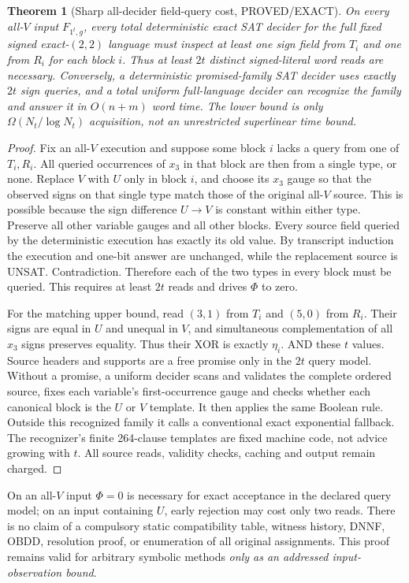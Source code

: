 \documentclass[11pt]{article}
\newtheorem{theorem}{Theorem}
\begin{document}
\begin{theorem}[Sharp all-decider field-query cost, PROVED/EXACT]
On \emph{every} all-$V$ input $F_{1^t,g}$, every total deterministic exact SAT decider for the \emph{full} fixed signed exact-$(2,2)$ language must inspect at least one sign field from $T_i$ \emph{and} one from $R_i$ for each block $i$. Thus at least $2t$ distinct signed-literal word reads are necessary. Conversely, a deterministic promised-family SAT decider uses exactly $2t$ sign queries, and a total uniform full-language decider can recognize the family and answer it in $O(n+m)$ word time. The lower bound is only $\Omega(N_t/\log N_t)$ acquisition, not an unrestricted superlinear time bound.
\end{theorem}
\begin{proof}
Fix an all-$V$ execution and suppose some block $i$ lacks a query from one of $T_i,R_i$. All queried occurrences of $x_3$ in that block are then from a single type, or none. Replace $V$ with $U$ only in block $i$, and choose its $x_3$ gauge so that the observed signs on that single type match those of the original all-$V$ source. This is possible because the sign difference $U\to V$ is constant within either type. Preserve all other variable gauges and all other blocks. Every source field queried by the deterministic execution has exactly its old value. By transcript induction the execution and one-bit answer are unchanged, while the replacement source is UNSAT. Contradiction. Therefore each of the two types in every block must be queried. This requires at least $2t$ reads and drives $\Phi$ to zero.

For the matching upper bound, read $(3,1)$ from $T_i$ and $(5,0)$ from $R_i$. Their signs are equal in $U$ and unequal in $V$, and simultaneous complementation of all $x_3$ signs preserves equality. Thus their XOR is exactly $\eta_i$. AND these $t$ values. Source headers and supports are a free promise only in the $2t$ query model. Without a promise, a uniform decider scans and validates the complete ordered source, fixes each variable's first-occurrence gauge and checks whether each canonical block is the $U$ or $V$ template. It then applies the same Boolean rule. Outside this recognized family it calls a conventional exact exponential fallback. The recognizer's finite 264-clause templates are fixed machine code, not advice growing with $t$. All source reads, validity checks, caching and output remain charged.
\end{proof}
On an all-$V$ input $\Phi=0$ is necessary for exact acceptance in the declared query model; on an input containing $U$, early rejection may cost only two reads. There is no claim of a compulsory static compatibility table, witness history, DNNF, OBDD, resolution proof, or enumeration of all original assignments. This proof remains valid for arbitrary symbolic methods \emph{only as an addressed input-observation bound}.
\end{document}
